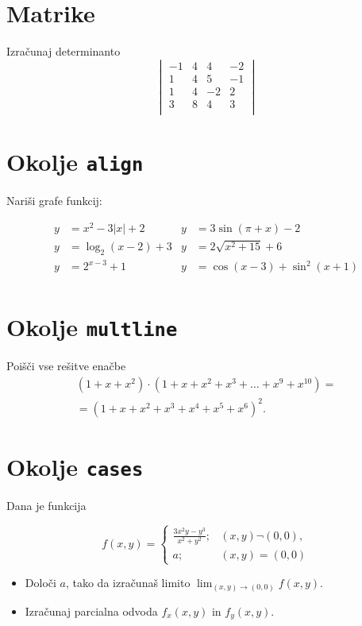 \documentclass[a4paper,12pt]{article}
\begin{document}
\section*{Matrike}
Izračunaj determinanto
\[
\begin{vmatrix}
    -1 & 4 & 4 & -2 \\
    1 & 4 & 5 & -1 \\
    1 & 4 & -2 & 2 \\
    3 & 8 & 4 & 3 \\
\end{vmatrix}\]
\section*{Okolje \texttt{align}}
Nariši grafe funkcij:

\begin{align*}
 y &= x^2 - 3|x| + 2   & y &= 3 \sin(\pi+x) - 2 \\
 y &= \log_2(x-2) + 3  & y &= 2 \sqrt{x^2+15} + 6 \\
 y &= 2^{x-3} + 1      & y &= \cos(x-3) + \sin^2(x+1) \\
\end{align*}

\section*{Okolje \texttt{multline}}
Poišči vse rešitve enačbe
\begin{multline*}
 (1+x+x^2) \cdot (1+x+x^2+x^3+\ldots+x^9+x^{10}) = \\
 =(1+x+x^2+x^3+x^4+x^5+x^6)^2.
\end{multline*}

\section*{Okolje \texttt{cases}}
Dana je funkcija

   \[
   f(x,y)=
\begin{cases}
   \frac{3x^2y-y^3}{x^2+y^2}; & (x,y) \neg (0,0), \\
   a; & (x,y)=(0,0)
\end{cases}
 \]
 \begin{itemize}
 \item Določi \(a\), tako da izračunaš limito \( \lim_{(x,y)\to(0,0)} f(x,y) \).
 \item Izračunaj parcialna odvoda \(f_x(x,y)\) in \(f_y(x,y)\).
 \end{itemize}

 
\end{document}
